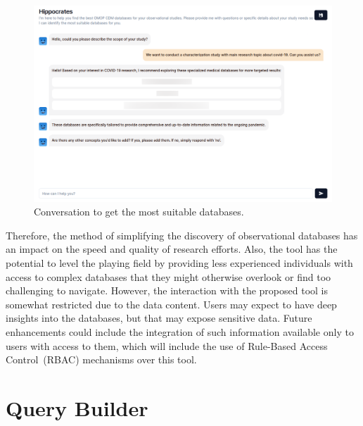\begin{figure}[H]
    \includegraphics[width=\textwidth]{figs/chapter5/chat1_blur.png}
    \centering
    \caption{Conversation to get the most suitable databases.}
    \label{fig_chat1}
\end{figure}


Therefore, the method of simplifying the discovery of observational databases has an impact on the speed and quality of research efforts. Also, the tool has the potential to level the playing field by providing less experienced individuals with access to complex databases that they might otherwise overlook or find too challenging to navigate. However, the interaction with the proposed tool is somewhat restricted due to the data content. Users may expect to have deep insights into the databases, but that may expose sensitive data. Future enhancements could include the integration of such information available only to users with access to them, which will include the use of Rule-Based Access Control~(RBAC) mechanisms over this tool.



\section{Query Builder}



